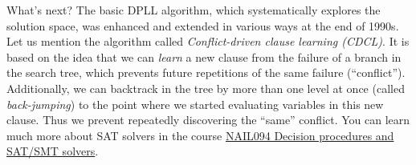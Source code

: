 What's next? The basic DPLL algorithm, which systematically explores the solution space, was enhanced and extended in various ways at the end of 1990s. Let us mention the algorithm called \emph{Conflict-driven clause learning (CDCL)}. It is based on the idea that we can \emph{learn} a new clause from the failure of a branch in the search tree, which prevents future repetitions of the same failure (``conflict''). Additionally, we can backtrack in the tree by more than one level at once (called \emph{back-jumping}) to the point where we started evaluating variables in this new clause. Thus we prevent repeatedly discovering the ``same'' conflict. You can learn much more about SAT solvers in the course \href{https://is.cuni.cz/studium/predmety/index.php?do=predmet&kod=NAIL094}{NAIL094 Decision procedures and SAT/SMT solvers}.
